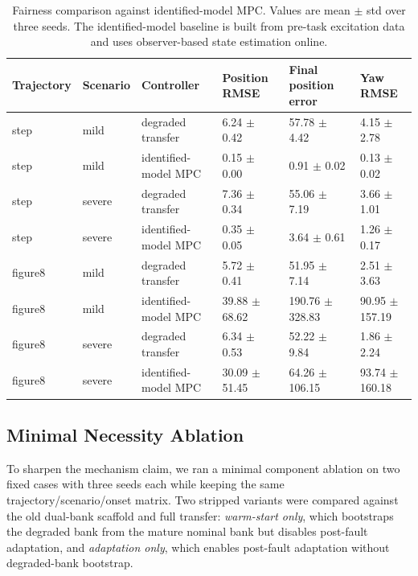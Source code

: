 \documentclass[12pt,a4paper]{article}
\begin{document}
\begin{table}[t]
  \centering
  \caption{Fairness comparison against identified-model MPC. Values are mean $\pm$ std over three seeds. The identified-model baseline is built from pre-task excitation data and uses observer-based state estimation online.}
  \label{tab:identified-mpc-compare}
  \scriptsize
  \begin{tabular}{llllll}
    \toprule
    Trajectory & Scenario & Controller & Position RMSE & Final position error & Yaw RMSE \\
    \midrule
    step & mild & degraded transfer & 6.24 $\pm$ 0.42 & 57.78 $\pm$ 4.42 & 4.15 $\pm$ 2.78 \\
    step & mild & identified-model MPC & 0.15 $\pm$ 0.00 & 0.91 $\pm$ 0.02 & 0.13 $\pm$ 0.02 \\
    step & severe & degraded transfer & 7.36 $\pm$ 0.34 & 55.06 $\pm$ 7.19 & 3.66 $\pm$ 1.01 \\
    step & severe & identified-model MPC & 0.35 $\pm$ 0.05 & 3.64 $\pm$ 0.61 & 1.26 $\pm$ 0.17 \\
    figure8 & mild & degraded transfer & 5.72 $\pm$ 0.41 & 51.95 $\pm$ 7.14 & 2.51 $\pm$ 3.63 \\
    figure8 & mild & identified-model MPC & 39.88 $\pm$ 68.62 & 190.76 $\pm$ 328.83 & 90.95 $\pm$ 157.19 \\
    figure8 & severe & degraded transfer & 6.34 $\pm$ 0.53 & 52.22 $\pm$ 9.84 & 1.86 $\pm$ 2.24 \\
    figure8 & severe & identified-model MPC & 30.09 $\pm$ 51.45 & 64.26 $\pm$ 106.15 & 93.74 $\pm$ 160.18 \\
    \bottomrule
  \end{tabular}
\end{table}

\subsection{Minimal Necessity Ablation}

To sharpen the mechanism claim, we ran a minimal component ablation on two fixed cases with three seeds each while keeping the same trajectory/scenario/onset matrix. Two stripped variants were compared against the old dual-bank scaffold and full transfer: \textit{warm-start only}, which bootstraps the degraded bank from the mature nominal bank but disables post-fault adaptation, and \textit{adaptation only}, which enables post-fault adaptation without degraded-bank bootstrap.
\end{document}
